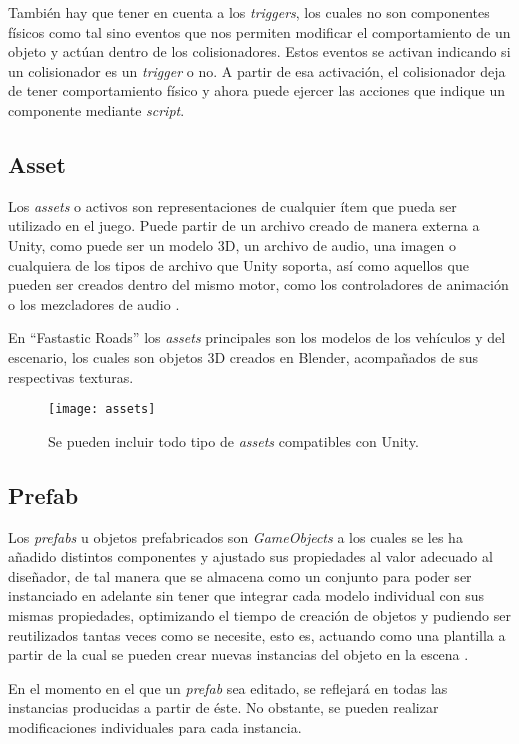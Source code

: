 También hay que tener en cuenta a los \textit{triggers}, los cuales no son componentes físicos como tal sino eventos que nos permiten modificar el comportamiento de un objeto y actúan dentro de los colisionadores. Estos eventos se activan indicando si un colisionador es un \textit{trigger} o no. A partir de esa activación, el colisionador deja de tener comportamiento físico y ahora puede ejercer las acciones que indique un componente mediante \textit{script}.

\subsection{Asset}

Los \textit{assets} o activos son representaciones de cualquier ítem que pueda ser utilizado en el juego. Puede partir de un archivo creado de manera externa a Unity, como puede ser un modelo 3D, un archivo de audio, una imagen o cualquiera de los tipos de archivo que Unity soporta, así como aquellos que pueden ser creados dentro del mismo motor, como los controladores de animación o los mezcladores de audio \cite{doc:assets}.

En ``Fastastic Roads'' los \textit{assets} principales son los modelos de los vehículos y del escenario, los cuales son objetos 3D creados en Blender, acompañados de sus respectivas texturas.

\begin{figure}[h]
	\centering
	\texttt{[image: assets]}
	\caption{Se pueden incluir todo tipo de \textit{assets} compatibles con Unity.}
	\label{fig:assets}
\end{figure}

\subsection{Prefab}

Los \textit{prefabs} u objetos prefabricados son \textit{GameObjects} a los cuales se les ha añadido distintos componentes y ajustado sus propiedades al valor adecuado al diseñador, de tal manera que se almacena como un conjunto para poder ser instanciado en adelante sin tener que integrar cada modelo individual con sus mismas propiedades, optimizando el tiempo de creación de objetos y pudiendo ser reutilizados tantas veces como se necesite, esto es, actuando como una plantilla a partir de la cual se pueden crear nuevas instancias del objeto en la escena \cite{doc:prefabs}.

En el momento en el que un \textit{prefab} sea editado, se reflejará en todas las instancias producidas a partir de éste. No obstante, se pueden realizar modificaciones individuales para cada instancia.

